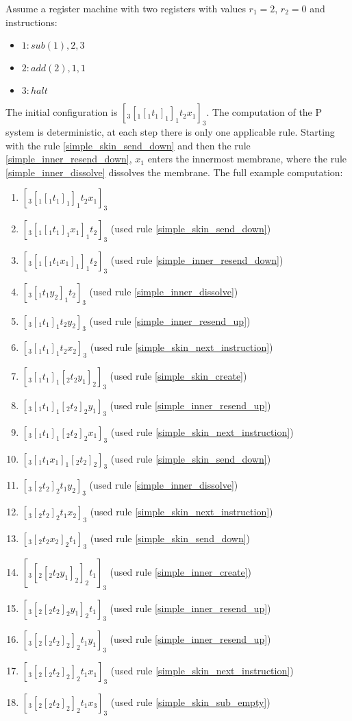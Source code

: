 \documentclass[submission,copyright,creativecommons]{../lib/lncs/llncs}
\begin{document}
\begin{example}
  Assume a register machine with two registers with values $r_1=2$, $r_2=0$ and instructions:
  \begin{itemize}
    \item $1: sub(1),2,3$
    \item $2: add(2),1,1$
    \item $3: halt$
  \end{itemize}

  The initial configuration is $[_3 [_1 [_1 t_1 ]_1 ]_1 t_2 x_1 ]_3$. The computation of the P system is deterministic, at each step there is only one applicable rule. Starting with the rule \ref{simple_skin_send_down} and then the rule \ref{simple_inner_resend_down}, $x_1$ enters the innermost membrane, where the rule \ref{simple_inner_dissolve} dissolves the membrane. The full example computation:

  \begin{enumerate}
    \item $[_3 [_1 [_1 t_1 ]_1 ]_1 t_2 x_1 ]_3$
    \item $[_3 [_1 [_1 t_1 ]_1 x_1 ]_1 t_2 ]_3$ (used rule \ref{simple_skin_send_down})
    \item $[_3 [_1 [_1 t_1 x_1 ]_1 ]_1 t_2 ]_3$ (used rule \ref{simple_inner_resend_down})
    \item $[_3 [_1 t_1 y_2 ]_1 t_2 ]_3$ (used rule \ref{simple_inner_dissolve})
    \item $[_3 [_1 t_1 ]_1 t_2 y_2 ]_3$ (used rule \ref{simple_inner_resend_up})
    \item $[_3 [_1 t_1 ]_1 t_2 x_2 ]_3$ (used rule \ref{simple_skin_next_instruction})
    \item $[_3 [_1 t_1 ]_1 [_2 t_2 y_1 ]_2 ]_3$ (used rule \ref{simple_skin_create})
    \item $[_3 [_1 t_1 ]_1 [_2 t_2 ]_2 y_1 ]_3$ (used rule \ref{simple_inner_resend_up})
    \item $[_3 [_1 t_1 ]_1 [_2 t_2 ]_2 x_1 ]_3$ (used rule \ref{simple_skin_next_instruction})
    \item $[_3 [_1 t_1 x_1 ]_1 [_2 t_2 ]_2 ]_3$ (used rule \ref{simple_skin_send_down})
    \item $[_3 [_2 t_2 ]_2 t_1 y_2 ]_3$ (used rule \ref{simple_inner_dissolve})
    \item $[_3 [_2 t_2 ]_2 t_1 x_2 ]_3$ (used rule \ref{simple_skin_next_instruction})
    \item $[_3 [_2 t_2 x_2 ]_2 t_1 ]_3$ (used rule \ref{simple_skin_send_down})
    \item $[_3 [_2 [_2 t_2 y_1 ]_2 ]_2 t_1 ]_3$ (used rule \ref{simple_inner_create})
    \item $[_3 [_2 [_2 t_2 ]_2 y_1 ]_2 t_1 ]_3$ (used rule \ref{simple_inner_resend_up})
    \item $[_3 [_2 [_2 t_2 ]_2 ]_2 t_1 y_1 ]_3$ (used rule \ref{simple_inner_resend_up})
    \item $[_3 [_2 [_2 t_2 ]_2 ]_2 t_1 x_1 ]_3$ (used rule \ref{simple_skin_next_instruction})
    \item $[_3 [_2 [_2 t_2 ]_2 ]_2 t_1 x_3 ]_3$ (used rule \ref{simple_skin_sub_empty})
  \end{enumerate}


\end{example}
\end{document}
